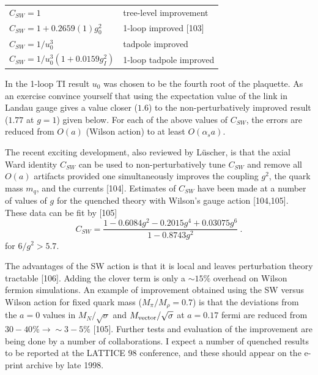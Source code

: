 \begin{center}
\begin{tabular}{ll}
$C_{SW} = 1$                                & tree-level improvement \\
$C_{SW} = 1 + 0.2659(1) g_0^2$              & 1-loop improved [103] \\
$C_{SW} = 1/u_0^3$                          & tadpole improved \\
$C_{SW} = 1/u_0^3 (1 + 0.0159 g_I^2)$       & 1-loop tadpole improved \\
\end{tabular}
\end{center}

In the 1-loop TI result $u_0$ was chosen to be the fourth root of the
plaquette.  As an exercise convince yourself that using the expectation
value of the link in Landau gauge gives a value closer ($1.6$)
to the non-perturbatively improved result ($1.77$ at $g=1$) given
below.  For each of the above values of $C_{SW}$, the errors are reduced
from $O(a)$ (Wilson action) to at least $O(\alpha_s a)$.

The recent exciting development, also reviewed by L\"uscher, is that
the axial Ward identity $C_{SW}$ can be used to non-perturbatively
tune $C_{SW}$ and remove all $O(a)$ artifacts provided one
simultaneously improves the coupling $g^2$, the quark mass $m_q$, and
the currents [104].  Estimates of $C_{SW}$ have been made
at a number of values of $g$ for the quenched theory with Wilson's
gauge action [104,105].  These data can be fit by [105]
\begin{equation}
C_{SW} = \frac{1 - 0.6084 g^2 - 0.2015 g^4 + 0.03075 g^6}{1 - 0.8743 g^2} \ .
\label{eq:CSWnonpert}
\end{equation}
for $6/g^2 > 5.7$.

The advantages of the SW action is that it is local and leaves
perturbation theory tractable [106].  Adding the clover
term is only a $\sim 15\%$ overhead on Wilson fermion simulations.  An
example of improvement obtained using the SW versus Wilson action
for fixed quark mass ($M_\pi/M_\rho = 0.7$) is that the deviations
from the $a=0$ values in $M_N/\sqrt{\sigma}$ and $M_{\rm vector}/\sqrt{\sigma}$ at
$a=0.17$ fermi are reduced from $30-40\% \to \sim 3-5\%$
[105].  Further tests and evaluation of the improvement are
being done by a number of collaborations.  I expect a number of
quenched results to be reported at the LATTICE 98 conference, and
these should appear on the e-print archive by late 1998.


